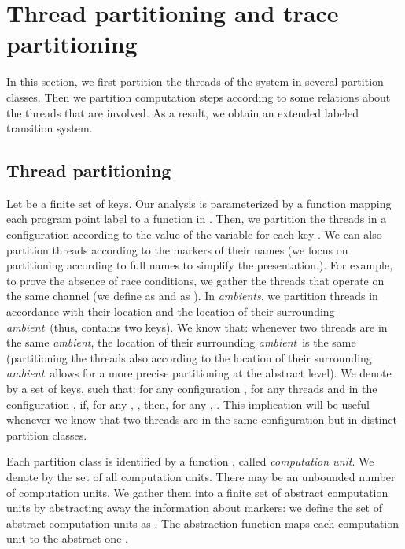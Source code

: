 \documentclass{article}
\newcommand{\ambient}{\emph{ambient}}
\newcommand{\ambients}{\emph{ambients}}
\begin{document}
\section{Thread partitioning and trace partitioning}
\label{partition class}

In this section, we first partition the threads of the system in several partition classes. Then we partition computation steps according to some relations about the threads that are involved. As a result, we obtain an extended labeled transition system.

\subsection{Thread partitioning}
Let  be a finite set of keys. 
Our analysis is parameterized by  a function  mapping each program point label  to a function in . 
Then, we partition the threads  in a configuration according to the value  of the variable  for each key . 
We can also partition threads according to the markers of their names (we focus on partitioning according to full names to simplify the presentation.).
For example, to prove the absence of race conditions, 
we gather the threads that operate on the same channel (we define   as  and  as ).
In \ambients, we partition threads in accordance with their location and the location of their surrounding \ambient\ (thus,  contains two keys). 
We know that: whenever two threads are in the  same \ambient, the location of their surrounding \ambient\ is the same (partitioning the threads also 
according to the location of their surrounding \ambient\ allows for a more precise  partitioning at the abstract level). 
We denote by  a  set of keys, such that:
for any configuration , for any threads  and  in the configuration , if,
for any , , then,  for any , .
This implication will be useful whenever we know that two threads are in the same configuration but in distinct partition classes.

Each partition class is identified by a function , called \emph{computation unit}.
We denote by  the set  of all computation units.
There may be an unbounded number of computation units. 
We gather them into a finite set of abstract computation units by abstracting away the information about markers: 
we define the set  of abstract computation units as . The abstraction function  maps each computation unit   to the abstract one .
\end{document}
